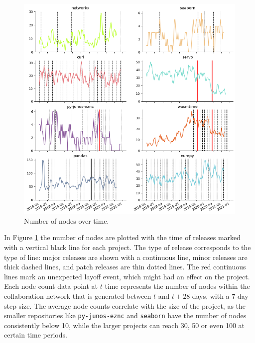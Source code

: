 \begin{figure}
    \centering
    \includegraphics[width=\textwidth]{figures/qualitative/number_of_nodes/all.png}
    \caption{Number of nodes over time.}
    \label{fig:nnodes}
\end{figure}

In Figure \ref{fig:nnodes} the number of nodes are plotted with the time of releases marked with a vertical black line for each project. The type of release corresponds to the type of line: major releases are shown with a continuous line, minor releases are thick dashed lines, and patch releases are thin dotted lines. The red continuous lines mark an unexpected layoff event, which might had an effect on the project. Each node count data point at $t$ time represents the number of nodes within the collaboration network that is generated between $t$ and $t+28$ days, with a 7-day step size. The average node counts correlate with the size of the project, as the smaller repositories like \texttt{py-junos-eznc} and \texttt{seaborn} have the number of nodes consistently below 10, while the larger projects can reach 30, 50 or even 100 at certain time periods.

